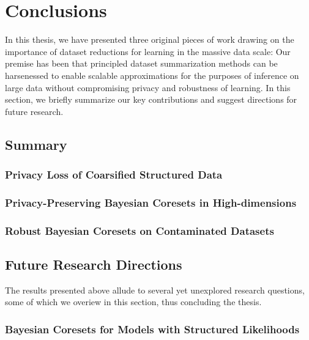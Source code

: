 \chapter{Conclusions}
\label{chap:chap6}
\renewcommand*{\MyPath}{../Chapter6}%
\newcommand{\etal}{\textit{et al}.}
\newcommand{\ie}{\textit{i}.\textit{e}.}

In this thesis, we have presented three original pieces of work drawing on the importance of dataset reductions for learning in the massive data scale: Our premise has been that principled dataset summarization methods can be harsenessed to enable scalable approximations for the purposes of inference on large data without compromising privacy and robustness of learning.
In this section, we briefly summarize our key contributions and suggest directions for future research.

\section{Summary}
\label{sec:summary}

\subsection{Privacy Loss of Coarsified Structured Data}
\label{subsec:ch3-summary}


\subsection{Privacy-Preserving Bayesian Coresets in High-dimensions}
\label{subsec:ch4-summary}

\subsection{Robust Bayesian Coresets on Contaminated Datasets}
\label{subsec:ch4-summary}


\section{Future Research Directions}
\label{sec:future-research-directions}
The results presented above allude to several yet unexplored research questions, some of which we overiew in this section, thus concluding the thesis.

\subsection{Bayesian Coresets for Models with Structured Likelihoods}
\label{subsec:structure-liks}

